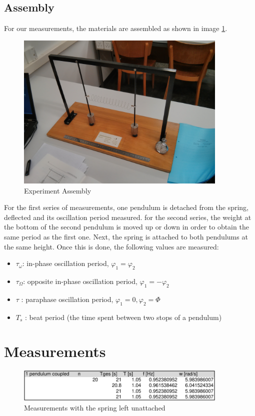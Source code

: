 \documentclass{scrreprt}
\renewcommand{\phi}{\varphi}
\begin{document}
\subsection{Assembly}
For our measurements, the materials are assembled as shown in image \ref{fig:assembly}.

\begin{figure}[H]
	\centering
  \includegraphics[width=0.9\textwidth]{img/assembly.jpg}
	\caption{Experiment Assembly}
	\label{fig:assembly}
\end{figure}
For the first series of measurements, one pendulum is detached from the spring, deflected and its oscillation period measured. for the second series, the weight at the bottom of the second pendulum is moved up or down in order to obtain the same period as the first one. Next, the spring is attached to both pendulums at the same height. Once this is done, the following values are measured:
\begin{itemize}
\item $\tau_{\omega}$: in-phase oscillation period, $\phi_1 = \phi_2$
\item $\tau_{\Omega}$: opposite in-phase oscillation period, $\phi_1 = -\phi_2$
\item $\tau$ : paraphase oscillation period, $\phi_1 = 0, \phi_2 = \Phi$
\item $T_s$ : beat period (the time spent between two stops of a pendulum)
\end{itemize}
\section{Measurements}

\begin{figure}[H]
	\centering
  \includegraphics[width=0.9\textwidth]{diag/uncoupled.pdf}
	\caption{Measurements with the spring left unattached}
	\label{fig:uncoupled}
\end{figure}
\end{document}
